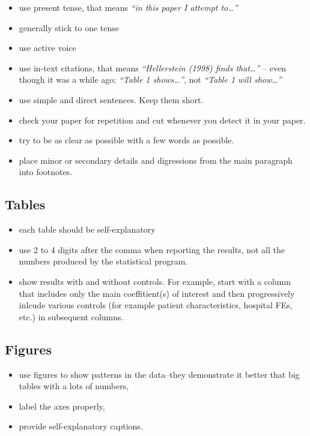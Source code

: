 \documentclass[
]{book}
\providecommand{\tightlist}{%
  \setlength{\itemsep}{0pt}\setlength{\parskip}{0pt}}
\begin{document}
\begin{itemize}
\tightlist
\item
  use present tense, that means \emph{``in this paper I attempt
  to\ldots{}''}
\item
  generally stick to one tense
\item
  use active voice
\item
  use in-text citations, that means \emph{``Hellerstein (1998) finds
  that\ldots{}''} -- even though it was a while ago; \emph{``Table 1
  shows\ldots{}''}, not \emph{``Table 1 will show\ldots{}''}
\item
  use simple and direct sentences. Keep them short.
\item
  check your paper for repetition and cut whenever you detect it in your
  paper.
\item
  try to be as clear as possible with a few words as possible.
\item
  place minor or secondary details and digressions from the main
  paragraph into footnotes.
\end{itemize}

\hypertarget{tables}{%
\subsection{Tables}\label{tables}}

\begin{itemize}
\tightlist
\item
  each table should be self-explanatory
\item
  use 2 to 4 digits after the comma when reporting the results, not all
  the numbers produced by the statistical program.
\item
  show results with and without controls. For example, start with a
  column that includes only the main coeffitient(s) of interest and then
  progressively inlcude various controls (for example patient
  characteristics, hospital FEs, etc.) in subsequent columns.
\end{itemize}

\hypertarget{figures}{%
\subsection{Figures}\label{figures}}

\begin{itemize}
\tightlist
\item
  use figures to show patterns in the data--they demonstrate it better
  that big tables with a lots of numbers,
\item
  label the axes properly,
\item
  provide self-explanatory captions.
\end{itemize}
\end{document}
